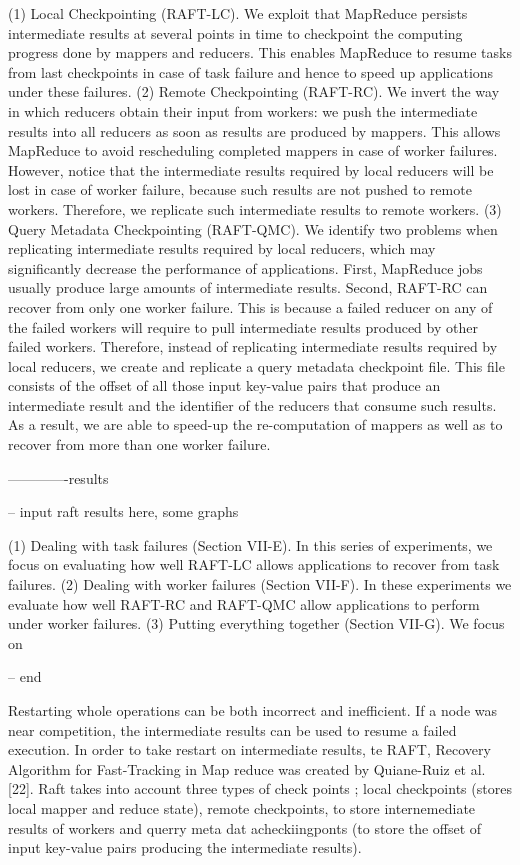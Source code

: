 \documentclass[10pt,twocolumn]{IEEEtran11}
\begin{document}
(1) Local Checkpointing (RAFT-LC). We exploit that MapReduce
persists intermediate results at several points in time
to checkpoint the computing progress done by mappers and
reducers. This enables MapReduce to resume tasks from last
checkpoints in case of task failure and hence to speed up
applications under these failures.
(2) Remote Checkpointing (RAFT-RC). We invert the way in
which reducers obtain their input from workers: we push
the intermediate results into all reducers as soon as results
are produced by mappers. This allows MapReduce to avoid
rescheduling completed mappers in case of worker failures.
However, notice that the intermediate results required by
local reducers will be lost in case of worker failure, because
such results are not pushed to remote workers. Therefore, we
replicate such intermediate results to remote workers.
(3) Query Metadata Checkpointing (RAFT-QMC). We identify
two problems when replicating intermediate results required
by local reducers, which may significantly decrease the performance
of applications. First, MapReduce jobs usually produce
large amounts of intermediate results. Second, RAFT-RC can
recover from only one worker failure. This is because a
failed reducer on any of the failed workers will require to
pull intermediate results produced by other failed workers.
Therefore, instead of replicating intermediate results required
by local reducers, we create and replicate a query metadata
checkpoint file. This file consists of the offset of all those
input key-value pairs that produce an intermediate result and
the identifier of the reducers that consume such results. As a
result, we are able to speed-up the re-computation of mappers
as well as to recover from more than one worker failure.

-------------results

-- input raft results here, some graphs

(1) Dealing with task failures (Section VII-E). In this series
of experiments, we focus on evaluating how well RAFT-LC
allows applications to recover from task failures.
(2) Dealing with worker failures (Section VII-F). In these
experiments we evaluate how well RAFT-RC and RAFT-QMC
allow applications to perform under worker failures.
(3) Putting everything together (Section VII-G). We focus on

-- end



Restarting whole operations can be both incorrect and inefficient.  If a node was near competition, the intermediate results can be used to resume a failed execution.  In order to take restart on intermediate results, te RAFT, Recovery Algorithm for Fast-Tracking in Map reduce was created by Quiane-Ruiz et al. [22].  Raft takes into account three types of check points
; local checkpoints (stores local mapper and reduce state), remote checkpoints, to store internemediate results of workers and querry meta dat acheckiingponts (to store the offset of input key-value pairs producing
the intermediate results).
    
\end{document}
